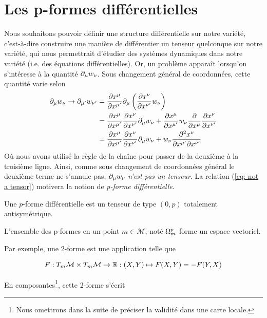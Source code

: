 \section{Les p-formes différentielles}
Nous souhaitons pouvoir définir une structure différentielle sur notre variété, c'est-à-dire construire une manière de différentier un tenseur quelconque sur notre variété, qui nous permettrait d'étudier des systèmes dynamiques dans notre variété (i.e. des équations différentielles). Or, un problème apparaît lorsqu'on s'intéresse à la quantité $\partial_\mu w_\nu$. Sous changement général de coordonnées, cette quantité varie selon
\begin{align}
\nonumber
    \label{eq: not a tensor}
    \partial_\mu w_\nu \to \partial_{\mu'} w_{\nu'} &= \frac{\partial x^\mu}{\partial x^{\mu'}} \partial_\mu \left( \frac{\partial x^\nu}{\partial x^{\nu'}} w_\nu \right)\\
    & = \frac{\partial x^\mu}{\partial x^{\mu'}} \frac{\partial x^\nu}{\partial x^{\nu'}} \partial_\mu w_\nu + \frac{\partial x^\mu}{\partial x^{\mu'}} w_\nu \frac{\partial}{\partial x^\mu}  \frac{\partial x^\nu}{\partial x^{\nu'}}\\
    \nonumber
    &= \frac{\partial x^\mu}{\partial x^{\mu'}} \frac{\partial x^\nu}{\partial x^{\nu'}} \partial_\mu w_\nu + w_\nu  \frac{\partial^2 x^\nu}{\partial x^{\mu'}\partial x^{\nu'}}
\end{align}
Où nous avons utilisé la règle de la chaîne pour passer de la deuxième à la troisième ligne. Ainsi, comme sous changement de coordonnées général le deuxième terme ne s'annule pas, $\partial_\mu w_\nu$ \emph{n'est pas un tenseur}. La relation (\ref{eq: not a tensor}) motivera la notion de \emph{p-forme différentielle}.
\begin{theoremframe}
    \begin{defi}
        Une $p$-forme différentielle est un tenseur de type $(0,p)$ totalement antisymétrique.
    \end{defi}
\end{theoremframe}
\begin{propri}
    L'ensemble des p-formes en un point $m\in \mathcal{M}$, noté $\Omega\indices*{^p_m}$ forme un espace vectoriel.
\end{propri}

Par exemple, une 2-forme est une application telle que 

\begin{equation}
    F: T_m\mathcal{M}\times T_m\mathcal{M}\rightarrow \mathbb{R}: (X, Y)\mapsto F(X, Y) = -F(Y, X)
\end{equation}

En composantes\footnote{Nous omettrons dans la suite de préciser la validité dans une carte locale.}, cette 2-forme s'écrit

